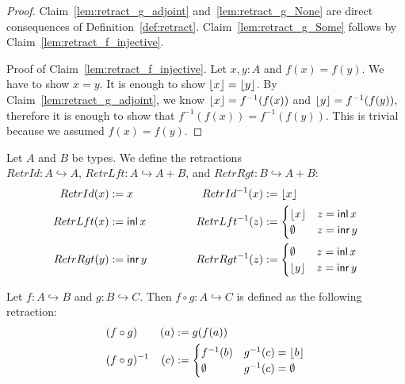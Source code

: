 \begin{proof}
  Claim~\ref{lem:retract_g_adjoint} and~\ref{lem:retract_g_None} are direct consequences of Definition~\ref{def:retract}.
  Claim~\ref{lem:retract_g_Some} follows by Claim~\ref{lem:retract_f_injective}.

  Proof of Claim~\ref{lem:retract_f_injective}.  Let $x, y: A$ and $f(x)=f(y)$.  We have to show $x=y$.  It is enough to show $\left\lfloor {x} \right\rfloor = \left\lfloor {y} \right\rfloor$.  By
  Claim~\ref{lem:retract_g_adjoint}, we know $\left\lfloor {x} \right\rfloor = f^{-1}(f(x))$ and $\left\lfloor {y} \right\rfloor = f^{-1}(f(y))$, therefore it is enough to show that
  $f^{-1}(f(x)) = f^{-1}(f(y))$.  This is trivial because we assumed $f(x)=f(y)$.
\end{proof}

\begin{definition}
  \label{def:retracts-basic}
  Let $A$ and $B$ be types.  We define the retractions\\
  $RetrId : A \hookrightarrow A$, $RetrLft : A \hookrightarrow A+B$, and $RetrRgt : B \hookrightarrow A+B$:
  \begin{alignat*}{2}
    RetrId(x)  &:= x      &\qquad\qquad RetrId ^{-1} (x) &:= \left\lfloor {x} \right\rfloor \\
    RetrLft(x) &:= \operatorname{\mathsf{inl}} x &             RetrLft^{-1} (z) &:=
    \begin{cases}
      \left\lfloor {x} \right\rfloor & z = \operatorname{\mathsf{inl}} x \\
      \emptyset   & z = \operatorname{\mathsf{inr}} y
    \end{cases} \\
    RetrRgt(y) &:= \operatorname{\mathsf{inr}} y & RetrRgt^{-1} (z) &:=
    \begin{cases}
      \emptyset   & z = \operatorname{\mathsf{inl}} x \\
      \left\lfloor {y} \right\rfloor & z = \operatorname{\mathsf{inr}} y
    \end{cases}
  \end{alignat*}
\end{definition}

\begin{definition}
  \label{def:retract-compose}
  Let $f : A \hookrightarrow B$ and $g : B \hookrightarrow C$.  Then $f \circ g : A \hookrightarrow C$ is defined as the following retraction:
  \begin{alignat*}{2}
    & (f \circ g)      & (a) &:= g(f(a)) \\
    & (f \circ g)^{-1} & (c) &:=
    \begin{cases}
      f^{-1}(b) & g^{-1}(c) = \left\lfloor {b} \right\rfloor \\
      \emptyset & g^{-1}(c) = \emptyset
    \end{cases}
  \end{alignat*}
\end{definition}




